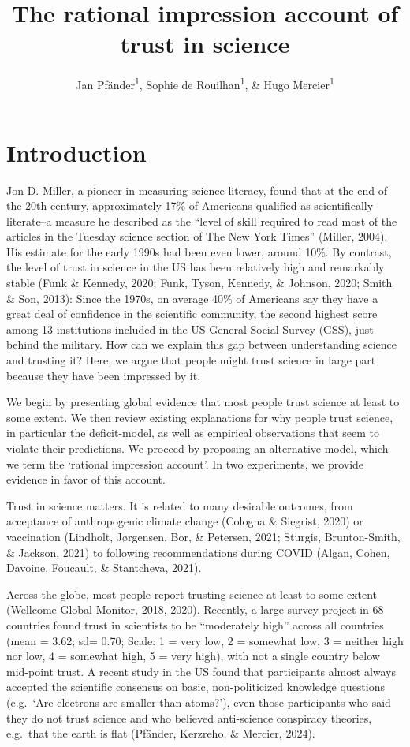 \documentclass[
  doc,floatsintext]{apa6}
\title{The rational impression account of trust in science}
\author{Jan Pfänder\textsuperscript{1}, Sophie de Rouilhan\textsuperscript{1}, \& Hugo Mercier\textsuperscript{1}}
\date{}
\affiliation{\vspace{0.5cm}\textsuperscript{1} Institut Jean Nicod, Département d'études cognitives, ENS, EHESS, PSL University, CNRS, France}
\begin{document}
\maketitle

\section{Introduction}\label{introduction}

Jon D. Miller, a pioneer in measuring science literacy, found that at the end of the 20th century, approximately 17\% of Americans qualified as scientifically literate--a measure he described as the ``level of skill required to read most of the articles in the Tuesday science section of The New York Times'' (Miller, 2004). His estimate for the early 1990s had been even lower, around 10\%. By contrast, the level of trust in science in the US has been relatively high and remarkably stable (Funk \& Kennedy, 2020; Funk, Tyson, Kennedy, \& Johnson, 2020; Smith \& Son, 2013): Since the 1970s, on average 40\% of Americans say they have a great deal of confidence in the scientific community, the second highest score among 13 institutions included in the US General Social Survey (GSS), just behind the military. How can we explain this gap between understanding science and trusting it? Here, we argue that people might trust science in large part because they have been impressed by it.

We begin by presenting global evidence that most people trust science at least to some extent. We then review existing explanations for why people trust science, in particular the deficit-model, as well as empirical observations that seem to violate their predictions. We proceed by proposing an alternative model, which we term the `rational impression account'. In two experiments, we provide evidence in favor of this account.

Trust in science matters. It is related to many desirable outcomes, from acceptance of anthropogenic climate change (Cologna \& Siegrist, 2020) or vaccination (Lindholt, Jørgensen, Bor, \& Petersen, 2021; Sturgis, Brunton-Smith, \& Jackson, 2021) to following recommendations during COVID (Algan, Cohen, Davoine, Foucault, \& Stantcheva, 2021).

Across the globe, most people report trusting science at least to some extent (Wellcome Global Monitor, 2018, 2020). Recently, a large survey project in 68 countries found trust in scientists to be ``moderately high'' across all countries (mean = 3.62; sd= 0.70; Scale: 1 = very low, 2 = somewhat low, 3 = neither high nor low, 4 = somewhat high, 5 = very high), with not a single country below mid-point trust. A recent study in the US found that participants almost always accepted the scientific consensus on basic, non-politicized knowledge questions (e.g.~`Are electrons are smaller than atoms?'), even those participants who said they do not trust science and who believed anti-science conspiracy theories, e.g.~that the earth is flat (Pfänder, Kerzreho, \& Mercier, 2024).
\end{document}
